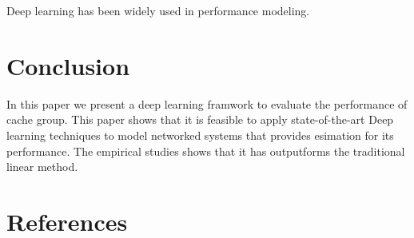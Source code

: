 \documentclass[5p]{elsarticle}
\begin{document}
Deep learning has been widely used in performance modeling. 

\section{Conclusion}

In this paper we present a deep learning framwork to evaluate the performance of cache group. This paper shows that it is feasible to apply state-of-the-art Deep learning techniques to model networked systems that provides esimation for its performance. The empirical studies shows that it has outputforms the traditional linear method.
\section*{References}



\end{document}
